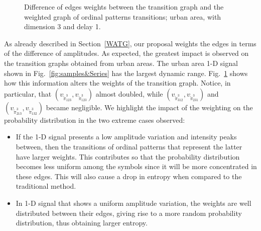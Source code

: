 \documentclass[journal]{IEEEtran}
\begin{document}
	\begin{figure}%
		\centering
		\caption{Difference of edges weights between the transition graph and the weighted graph of ordinal patterns transitions; urban area, with dimension 3 and delay 1.}
		\label{fig:graphs}
	\end{figure}
	
	As already described in Section~\ref{WATG}, our proposal weights the edges in terms of the difference of amplitudes.
	As expected, the greatest impact is observed on the transition graphs obtained from urban areas.
	The urban area \mbox{1-D} signal shown in Fig.~\ref{fig:samples&Series} has the largest dynamic range.
	Fig.~\ref{fig:graphs} shows how this information alters the weights of the transition graph.
	Notice, in particular, that 
	$(v_{\widetilde \pi^3_{123}}, v_{\widetilde \pi^3_{123}})$ almost doubled, while 
	$(v_{\widetilde \pi^3_{312}}, v_{\widetilde \pi^3_{231}})$ and $(v_{\widetilde \pi^3_{213}}, v_{\widetilde \pi^3_{132}})$ became negligible.
	We highlight the impact of the weighting on the probability distribution in the two extreme cases observed:
	\begin{itemize}
		\item If the \mbox{1-D} signal presents a low amplitude variation and intensity peaks between, then the transitions of ordinal patterns that represent the latter have larger weights.
		This contributes so that the probability distribution becomes less uniform among the symbols since it will be more concentrated in these edges.
		This will also cause a drop in entropy when compared to the traditional method.
		\item In \mbox{1-D} signal that shows a uniform amplitude variation, the weights are well distributed between their edges, giving rise to a more random probability distribution, thus obtaining larger entropy.
	\end{itemize}
	
\end{document}
